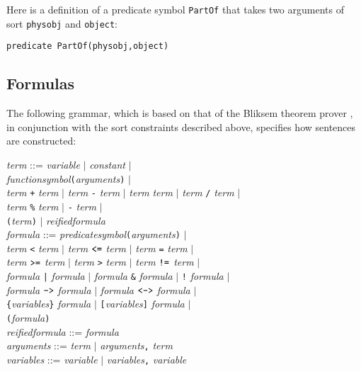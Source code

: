 \documentclass{article}
\begin{document}
Here is a definition of a predicate symbol {\tt PartOf} that takes two
arguments of sort {\tt physobj} and {\tt object}:
\begin{verbatim}
predicate PartOf(physobj,object)
\end{verbatim}

\subsection{Formulas}

The following grammar,
which is based on that of the Bliksem theorem prover \cite{deNivelle:1999},
in conjunction with the sort constraints described above, specifies
how sentences are constructed:
\begin{tabbing}
{\em term} ::= \= {\em variable} $\mid$ {\em constant} $\mid$ \\
         \> {\em functionsymbol}{\tt (}{\em arguments}{\tt )} $\mid$ \\
         \> {\em term} {\tt +} {\em term} $\mid$ {\em term} {\tt -} {\em term} $\mid$ {\em term} {\tt *} {\em term} $\mid$ {\em term} {\tt /} {\em term} $\mid$ \\
         \> {\em term} {\tt \%} {\em term} $\mid$ {\tt -} {\em term} $\mid$ \\
         \> {\tt (}{\em term}{\tt )} $\mid$ {\em reifiedformula} \\
{\em formula} ::= \= {\em predicatesymbol}{\tt (}{\em arguments}{\tt )} $\mid$ \\
            \> {\em term} {\tt <} {\em term} $\mid$ {\em term} $\mbox{\tt <=}$ {\em term} $\mid$ {\em term} {\tt =} {\em term} $\mid$ \\
            \> {\em term} $\mbox{\tt >=}$ {\em term} $\mid$ {\em term} {\tt >} {\em term} $\mid$ {\em term} $\mbox{\tt !=}$ {\em term} $\mid$ \\
            \> {\em formula} {\tt |} {\em formula} $\mid$ {\em formula} {\tt \&} {\em formula} $\mid$ {\tt !} {\em formula} $\mid$ \\
            \> {\em formula} $\mbox{\tt ->}$ {\em formula} $\mid$ {\em formula} $\mbox{\tt <->}$ {\em formula} $\mid$ \\
            \> {\tt \{}{\em variables}{\tt \}} {\em formula} $\mid$ {\tt [}{\em variables}{\tt ]} {\em formula} $\mid$ \\
            \> {\tt (}{\em formula}{\tt )} \\
{\em reifiedformula} ::= \= {\em formula} \\
{\em arguments} ::= \= {\em term} $\mid$ {\em arguments}{\tt ,} {\em term} \\
{\em variables} ::= \= {\em variable} $\mid$ {\em variables}{\tt ,} {\em variable}
\end{tabbing}
\end{document}

